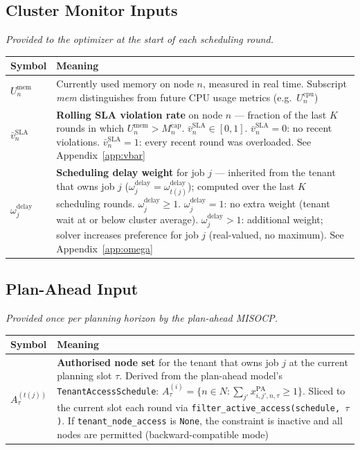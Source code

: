 \documentclass[11pt]{article}
\newcommand{\vbarsla}{\bar{v}_n^{\text{SLA}}}
\newcommand{\Mcap}{M_n^{\text{cap}}}
\newcommand{\Umem}{U_n^{\text{mem}}}
\newcommand{\omdelay}{\omega_j^{\text{delay}}}
\begin{document}
\subsection*{Cluster Monitor Inputs}
\textit{Provided to the optimizer at the start of each scheduling round.}

\medskip
\begin{center}
\begin{tabular}{@{}l p{10.5cm}@{}}
\toprule
Symbol & Meaning \\
\midrule
$\Umem$ & Currently used memory on node $n$, measured in real time.
  Subscript \textit{mem} distinguishes from future CPU usage metrics
  (e.g.\ $U_n^{\text{cpu}}$) \\[6pt]
$\vbarsla$ & \textbf{Rolling SLA violation rate} on node $n$ --- fraction of
  the last $K$ rounds in which $\Umem > \Mcap$.
  $\bar{v}_n^{\text{SLA}} \in [0,1]$.
  $\vbarsla = 0$: no recent violations. \quad
  $\vbarsla = 1$: every recent round was overloaded.
  See Appendix~\ref{app:vbar} \\[6pt]
$\omdelay$ & \textbf{Scheduling delay weight} for job $j$ --- inherited from
  the tenant that owns job $j$ ($\omdelay = \omega_{t(j)}^{\text{delay}}$);
  computed over the last $K$ scheduling rounds. $\omdelay \geq 1$. \quad
  $\omdelay = 1$: no extra weight (tenant wait at or below cluster average).
  $\omdelay > 1$: additional weight; solver increases preference for job $j$
  (real-valued, no maximum). See Appendix~\ref{app:omega} \\
\bottomrule
\end{tabular}
\end{center}

\subsection*{Plan-Ahead Input}
\textit{Provided once per planning horizon by the plan-ahead MISOCP.}

\medskip
\begin{center}
\begin{tabular}{@{}l p{10.5cm}@{}}
\toprule
Symbol & Meaning \\
\midrule
$A_{\tau}^{(t(j))}$ & \textbf{Authorised node set} for the tenant that owns
  job $j$ at the current planning slot $\tau$.
  Derived from the plan-ahead model's \texttt{TenantAccessSchedule}:
  $A_{\tau}^{(i)} = \{n \in N : \sum_{j'} x_{i,j',n,\tau}^{\text{PA}} \ge 1\}$.
  Sliced to the current slot each round via
  \texttt{filter\_active\_access(schedule, $\tau$)}.
  If \texttt{tenant\_node\_access} is \texttt{None}, the constraint is
  inactive and all nodes are permitted (backward-compatible mode) \\
\bottomrule
\end{tabular}
\end{center}
\end{document}
